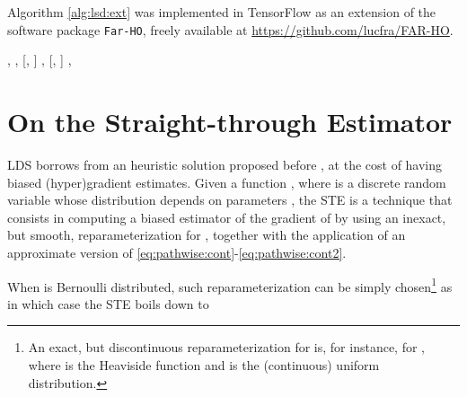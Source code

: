 \documentclass{article}
\newcommand{\lds}{\textsc{LDS}\xspace}
\begin{document}
Algorithm \ref{alg:lsd:ext} was implemented in TensorFlow as an extension of the software package \texttt{Far-HO}, freely available at \url{https://github.com/lucfra/FAR-HO}.


\begin{algorithm}[t]
\small
	\caption{\textbf{\lds} (extended)}
	\label{alg:lsd:ext}
	\begin{algorithmic}[1]
		 , , [, ] 
		 , [, ] 
		\STATE  \hfill {}
		\STATE   \hfill {} 
			\STATE 
			\STATE 
\hfill {} 
			\STATE   \hfill {}
			\STATE 
\STATE  
				\STATE 
				\STATE 
				  \STATE  
				    \STATE 
				    \STATE 
				\ENDFOR 
				\STATE  \hfill {}
			\ENDIF
			\ENDWHILE
\ENDWHILE
		 ,  \hfill {}
	\end{algorithmic}
\end{algorithm}







\section{On the Straight-through Estimator}
\label{sec:app:onSTE}








\lds{} borrows from an heuristic solution proposed before \citep{bengio2013estimating}, at the cost of having biased (hyper)gradient estimates. 
Given a function , where  is a discrete random variable whose distribution depends on parameters , the STE is a technique that consists in computing a biased estimator of the gradient of  
by using an inexact, but smooth, reparameterization for , together with the application of an approximate version of \eqref{eq:pathwise:cont}-\eqref{eq:pathwise:cont2}. 

When  is Bernoulli distributed, such reparameterization can be simply chosen\footnote{An exact, 
but discontinuous reparameterization for  is, for instance,  for , where  is the Heaviside function and  is the (continuous) uniform distribution.} 
as   in which case the STE boils down to 
\end{document}
